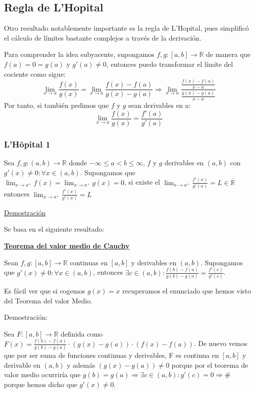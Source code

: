 \documentclass[10pt,a4paper,openright]{book}
\theoremstyle{break}
\begin{document}
\subsection{Regla de L'Hopital}
Otro resultado notablemente importante es la regla de L'Hopital, pues simplificó el cálculo de límites bastante complejos a través de la derivación.

Para comprender la idea subyacente, supongamos $f,g: [a,b]\rightarrow \mathbb R$ de manera que $f(a)=0=g(a)$ y $g'(a)\neq 0$, entonces puedo transformar el límite del cociente como sigue:
$$\lim_{x\rightarrow a} \frac{f(x)}{g(x)}=\lim_{x\rightarrow a} \frac{f(x)-f(a)}{g(x)-g(a)}\Rightarrow \lim_{x\rightarrow a}\frac{\frac{f(x)-f(a)}{x-a}}{\frac{g(x)-g(a)}{x-a}}$$
Por tanto, si también pedimos que $f$ y $g$ sean derivables en $a$:
$$\lim_{x\rightarrow a} \frac{f(x)}{g(x)}=\frac{f'(a)}{g'(a)}$$

\subsubsection{L'Hôpital 1}
Sea $f,g: (a,b) \rightarrow \mathbb R$ donde $-\infty \leq a < b \leq \infty$, $f$ y $g$ derivables en $(a,b)$ con $g'(x)\neq 0: \forall x\in (a,b)$. Supongamos que $\lim_{x\rightarrow a^+} f(x)=\lim_{x\rightarrow a^+} g(x)=0$, si existe el $\lim_{x\rightarrow a^+} \frac{f'(x)}{g'(x)}=L\in \overline{\mathbb R}$ entonces $\lim_{x\rightarrow a^+}\frac{f'(x)}{g'(x)}=L$

\underline{Demostración}

Se basa en el siguiente resultado:

\underline{\textbf{Teorema del valor medio de Cauchy}}

Sean $f,g: [a,b]\rightarrow \mathbb R$ continuas en $[a,b]$ y derivables en $(a,b)$. Supongamos que $g'(x)\neq 0: \forall x\in (a,b)$, entonces $\exists c\in (a,b): \frac{f(b)-f(a)}{g(b)-g(a)}=\frac{f'(c)}{g'(c)}$.

Es fácil ver que si cogemos $g(x)=x$ recuperamos el enunciado que hemos visto del Teorema del valor Medio.

Demostración:

Sea $F:[a,b]\rightarrow\mathbb R$ definida como $F(x)=\frac{f(b)-f(a)}{g(b)-g(a)}\cdot (g(x)-g(a))\cdot (f(x)-f(a))$. De nuevo vemos que por ser suma de funciones continuas y derivables, F es continua en $[a,b]$ y derivable en $(a,b)$ y además $(g(x)-g(a))\neq 0$ porque por el teorema de valor medio ocurriría que $g(b)=g(a)\Rightarrow \exists c\in  (a,b): g'(c)=0\Rightarrow \#$ porque hemos dicho que $g'(x)\neq 0$.
\end{document}
